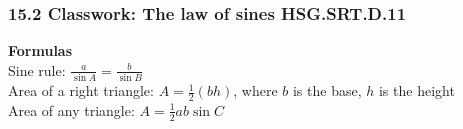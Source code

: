 

\fancyhead[LE]{\thepage}



\subsubsection*{15.2 Classwork: The law of sines \hfill HSG.SRT.D.11}
\textbf{Formulas}\\[0.25cm]
Sine rule: $\displaystyle \frac{a}{\sin A} = \frac{b}{\sin B}$\\[0.25cm]
Area of a right triangle: $\displaystyle A=\frac{1}{2}(bh)$, where $b$ is the base, $h$ is the height\\[0.25cm]
Area of any triangle: $\displaystyle A=\frac{1}{2}ab \sin C$


